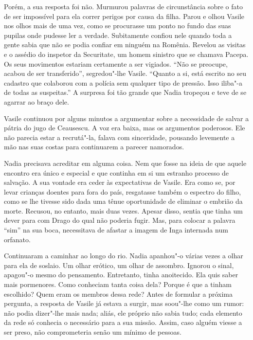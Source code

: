 Porém, a sua resposta foi não. Murmurou palavras de circunstância sobre
o fato de ser impossível para ela correr perigos por causa da filha.
Parou e olhou Vasile nos olhos mais de uma vez, como se procurasse um
ponto no fundo das suas pupilas onde pudesse ler a verdade. Subitamente confiou nele quando toda a gente sabia que não se podia confiar
em ninguém na Romênia. Revelou as visitas e o assédio do inspetor da
Securitate, um homem sinistro que se chamava Pacepa. Os seus movimentos
estariam certamente a ser vigiados. ``Não se preocupe, acabou de ser
transferido'', segredou"-lhe Vasile. ``Quanto a si, está escrito no seu
cadastro que colaborou com a polícia sem qualquer tipo de pressão. Isso
iliba"-a de todas as suspeitas.'' A surpresa foi tão grande que Nadia
tropeçou e teve de se agarrar ao braço dele.

Vasile continuou por alguns minutos a argumentar
sobre a necessidade de salvar a pátria do jugo de Ceausescu. A voz era
baixa, mas os argumentos poderosos. Ele não parecia estar a recrutá"-la,
falava com sinceridade, pousando levemente a mão nas suas costas para
continuarem a parecer namorados.

Nadia precisava acreditar em alguma coisa. Nem que fosse na ideia de
que aquele encontro era único e especial e que continha em si um
estranho processo de salvação. A sua vontade era ceder às expectativas
de Vasile. Era como se, por levar crianças doentes para fora do país,
resgatasse também o espectro do filho, como se lhe tivesse sido dada uma
tênue oportunidade de eliminar o embrião da morte. Recusou, no entanto,
mais duas vezes. Apesar disso, sentia que tinha um dever para com Drago
do qual
não poderia fugir. Mas, para colocar a palavra ``sim'' na sua boca,
necessitava de afastar a imagem de Inga internada num orfanato.

Continuaram a caminhar ao longo do rio. Nadia apanhou"-o várias vezes a
olhar para ela de soslaio. Um olhar erótico, um olhar de assombro.
Ignorou o sinal, apagou"-o mesmo do pensamento. Entretanto, tinha
anoitecido. Ela quis saber mais pormenores. Como conheciam tanta coisa
dela? Porque é que a tinham escolhido? Quem eram os membros dessa rede?
Antes de formular a próxima pergunta, a resposta de Vasile já estava a
surgir, mas soou"-lhe como um rumor: não podia dizer"-lhe mais nada;
aliás, ele próprio não sabia tudo; cada elemento da rede só conhecia o
necessário para a sua missão. Assim, caso alguém viesse a ser preso, não
comprometeria senão um mínimo de pessoas.

